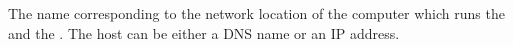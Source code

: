 \item[AUT Agent Host]{
The name corresponding to the network location of the computer which runs the \gdserver{} and the \gdaut{}. The host can be either a DNS name or an IP address.
}
